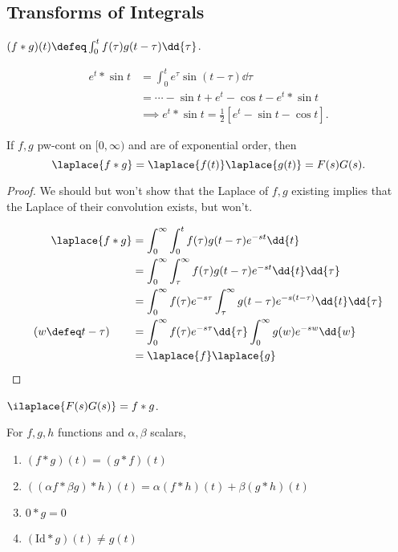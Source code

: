 \subsection{Transforms of Integrals}

\begin{definition}[Convolution]
    $(f \ast g)(t) \defeq \int_0^t f(\tau)g(t - \tau) \dd{\tau}$.
\end{definition}

\begin{example}
    \begin{align*}
        e^{t} \ast \sin t &= \int_0^t e^{\tau} \sin(t - \tau) \dd{\tau}\\
        &= \cdots - \sin t+ e^t - \cos t - e^t \ast \sin t\\
        &\implies e^t \ast \sin t = \frac{1}{2}[e^t - \sin t - \cos t].
    \end{align*}
\end{example}

\begin{theorem}
    If $f, g$ pw-cont on $[0, \infty)$ and are of exponential order, then \[
    \laplace{f \ast g} = \laplace{f(t)}\laplace{g(t)}     = F(s)G(s).
    \]
\end{theorem}

\begin{proof}
    We should but won't show that the Laplace of $f,g$ existing implies that the Laplace of their convolution exists, but won't.

    \begin{align*}
        \laplace{f \ast g} &= \int_0^\infty \int_0^t f(\tau) g(t - \tau) e^{-st} \dd{t}\\
        &= \int_0^\infty \int_\tau^\infty f(\tau) g(t - \tau)e^{-st} \dd{t}\dd{\tau}\\
        &= \int_{0}^\infty f(\tau) e^{-s\tau} \int_\tau^\infty g(t - \tau)e^{-s(t - \tau)} \dd{t} \dd{\tau}\\
        (w \defeq t - \tau)\qquad &= \int_0^\infty f(\tau)e^{-s\tau} \dd{\tau}\int_0^\infty g(w) e^{-sw} \dd{w}\\
        &= \laplace{f}\laplace{g}
     \end{align*}
\end{proof}

\begin{corollary}
    $\ilaplace{F(s)G(s)} = f\ast g$.
\end{corollary}

\begin{proposition}
    For $f, g, h$ functions and $\alpha, \beta$ scalars, \begin{enumerate}[label=(\roman*)]
        \item $(f \ast g)(t) = (g \ast f)(t)$
        \item $((\alpha f \ast \beta g) \ast h)(t) = \alpha(f \ast h)(t) + \beta(g \ast h)(t)$
        \item $0 \ast g = 0$
        \item $(\text{Id} \ast g)(t) \neq g(t)$
    \end{enumerate}
\end{proposition}

